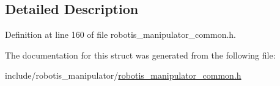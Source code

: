 \subsection{Detailed Description}


Definition at line 160 of file robotis\+\_\+manipulator\+\_\+common.\+h.



The documentation for this struct was generated from the following file\+:\begin{DoxyCompactItemize}
\item 
include/robotis\+\_\+manipulator/\hyperlink{robotis__manipulator__common_8h}{robotis\+\_\+manipulator\+\_\+common.\+h}\end{DoxyCompactItemize}

